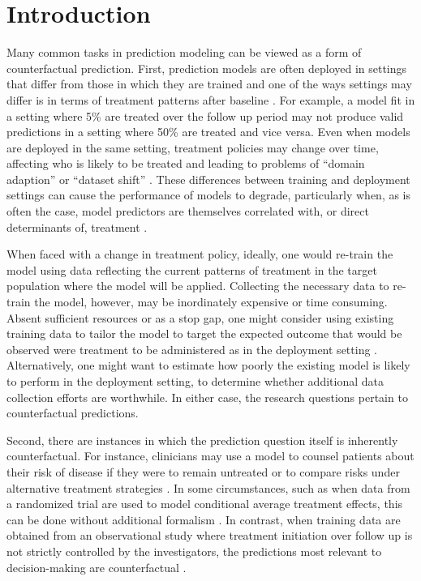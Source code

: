 \section{Introduction} \label{sec:introduction}

Many common tasks in prediction modeling can be viewed as a form of counterfactual prediction. First, prediction models are often deployed in settings that differ from those in which they are trained and one of the ways settings may differ is in terms of treatment patterns after baseline \cite{van_geloven_prediction_2020}. For example, a model fit in a setting where 5\% are treated over the follow up period may not produce valid predictions in a setting where 50\% are treated and vice versa. Even when models are deployed in the same setting, treatment policies may change over time, affecting who is likely to be treated and leading to problems of ``domain adaption'' or ``dataset shift'' \cite{finlayson_clinician_2021, subbaswamy_development_2020}. These differences between training and deployment settings can cause the performance of models to degrade, particularly when, as is often the case, model predictors are themselves correlated with, or direct determinants of, treatment \cite{pajouheshnia_accounting_2017,groenwold_explicit_2016-1}. 

When faced with a change in treatment policy, ideally, one would re-train the model using data reflecting the current patterns of treatment in the target population where the model will be applied. Collecting the necessary data to re-train the model, however, may be inordinately expensive or time consuming. Absent sufficient resources or as a stop gap, one might consider using existing training data to tailor the model to target the expected outcome that would be observed were treatment to be administered as in the deployment setting \cite{dickerman_predicting_2022}. Alternatively, one might want to estimate how poorly the existing model is likely to perform in the deployment setting, to determine whether additional data collection efforts are worthwhile. In either case, the research questions pertain to counterfactual predictions.

Second, there are instances in which the prediction question itself is inherently counterfactual. For instance, clinicians may use a model to counsel patients about their risk of disease if they were to remain untreated or to compare risks under alternative treatment strategies \cite{lin_scoping_2021,schulam_reliable_2017-1}. In some circumstances, such as when data from a randomized trial are used to model conditional average treatment effects, this can be done without additional formalism \cite{hoogland_tutorial_2021,kent_personalized_2018,kent_predictive_2020,glasziou_evidence_1995,dahabreh_using_2016}. In contrast, when training data are obtained from an observational study where treatment initiation over follow up is not strictly controlled by the investigators, the predictions most relevant to decision-making are counterfactual \cite{dickerman_counterfactual_2020,schulam_reliable_2017-1}. 


